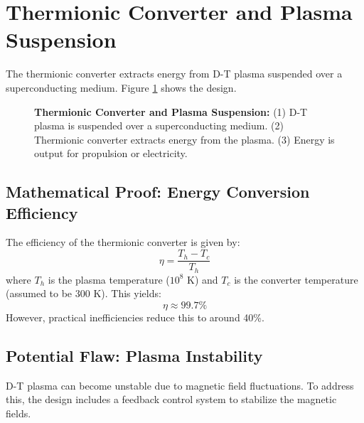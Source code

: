 \documentclass[12pt, a4paper]{article}
\begin{document}
\section{Thermionic Converter and Plasma Suspension}
The thermionic converter extracts energy from D-T plasma suspended over a superconducting medium. Figure \ref{fig:thermionic_converter} shows the design.

\begin{figure}[H]
\centering
{}
\caption{
\textbf{Thermionic Converter and Plasma Suspension:} 
(1) D-T plasma is suspended over a superconducting medium. 
(2) Thermionic converter extracts energy from the plasma. 
(3) Energy is output for propulsion or electricity.
}
\label{fig:thermionic_converter}
\end{figure}

\subsection{Mathematical Proof: Energy Conversion Efficiency}
The efficiency of the thermionic converter is given by:
\[
\eta = \frac{T_h - T_c}{T_h}
\]
where \( T_h \) is the plasma temperature ($10^8$ K) and \( T_c \) is the converter temperature (assumed to be 300 K). This yields:
\[
\eta \approx 99.7\%
\]
However, practical inefficiencies reduce this to around 40\%.

\subsection{Potential Flaw: Plasma Instability}
D-T plasma can become unstable due to magnetic field fluctuations. To address this, the design includes a feedback control system to stabilize the magnetic fields.
\end{document}
